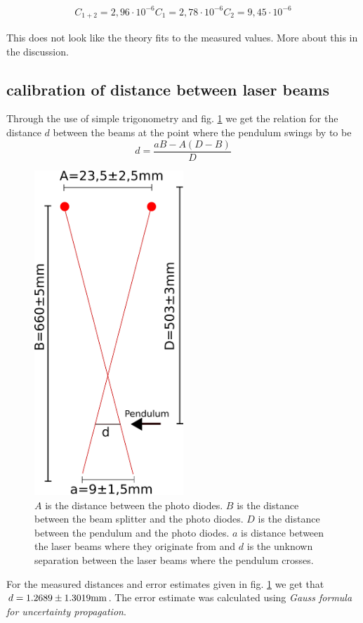 \begin{eqnarray}
C_{1+2} = 2,96 \cdot 10^{-6}
C_1 = 2,78 \cdot 10^{-6}
C_2 = 9,45 \cdot 10^{-6}
\end{eqnarray}

This does not look like the theory fits to the measured values. More about this in the discussion.

\subsection{calibration of distance between laser beams}\label{sec:calibration}
Through the use of simple trigonometry and fig. \ref{fig:calibration} we get the relation for the distance
$d$ between the beams at the point where the pendulum swings by to be
\begin{equation}
d = \frac{aB-A(D-B)}{D}
\end{equation}

\begin{figure}[htbp]
	\centering
	\includegraphics[width=0.5\textwidth]{img/calibration}
	\caption{$A$ is the distance between the photo diodes. $B$ is the distance between the beam splitter and the photo diodes. $D$ is the distance between the pendulum and the photo diodes. $a$ is distance between the laser beams where they originate from and $d$ is the unknown separation between the laser beams where the pendulum crosses.}
	\label{fig:calibration}
\end{figure}

For the measured distances and error estimates given in fig. \ref{fig:calibration} we get that
$d =  1.2689 \pm 1.3019 \rm{mm}$.
The error estimate was calculated using \emph{Gauss formula for uncertainty propagation}.


